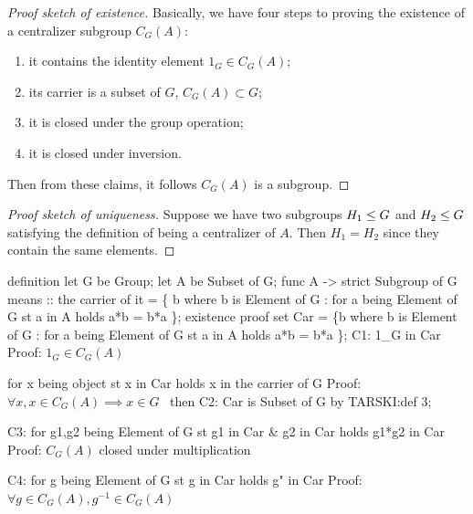 \begin{proof}[Proof sketch of existence]
Basically, we have four steps to proving the existence of a centralizer
subgroup $C_{G}(A)$:
\begin{enumerate}
\item it contains the identity element $1_{G}\in C_{G}(A)$;
\item its carrier is a subset of $G$, $C_{G}(A)\subset G$;
\item it is closed under the group operation;
\item it is closed under inversion.
\end{enumerate}
Then from these claims, it follows $C_{G}(A)$ is a subgroup.
\end{proof}

\begin{proof}[Proof sketch of uniqueness]
Suppose we have two subgroups $H_{1}\leq G$ and $H_{2}\leq G$
satisfying the definition of being a centralizer of $A$.
Then $H_{1}=H_{2}$ since they contain the same elements.
\end{proof}

\nwenddocs{}\endmoddef\nwstartdeflinemarkup{}\nwenddeflinemarkup
definition
  let G be Group;
  let A be Subset of G;
  func  A -> strict Subgroup of G means
  ::
  the carrier of it = \{ b where b is Element of G :
                        for a being Element of G st a in A holds a*b = b*a \};
  existence
  proof
    set Car = \{b where b is Element of G :
               for a being Element of G st a in A holds a*b = b*a \};
    C1: 1_G in Car
    \LA{}Proof: $1_{G}\in C_{G}(A)$~{\nwtagstyle{}}\RA{}

    for x being object st x in Car holds x in the carrier of G
    \LA{}Proof: $\forall x, x\in C_{G}(A)\implies x\in G$~{\nwtagstyle{}}\RA{}
    then C2: Car is Subset of G by TARSKI:def 3;

    C3: for g1,g2 being Element of G st g1 in Car & g2 in Car
    holds g1*g2 in Car
    \LA{}Proof: $C_{G}(A)$ closed under multiplication~{\nwtagstyle{}}\RA{}

    C4: for g being Element of G st g in Car holds g" in Car
    \LA{}Proof: $\forall g\in C_{G}(A), g^{-1}\in C_{G}(A)$~{\nwtagstyle{}}\RA{}

